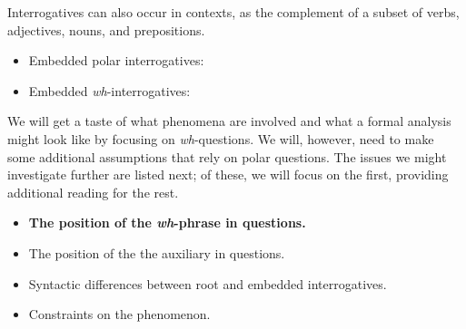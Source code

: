 \documentclass{article}
\begin{document}
Interrogatives can also occur in  contexts, as the complement of a subset of verbs, adjectives, nouns, and prepositions.
\begin{itemize}
\item Embedded polar interrogatives:
\begin{exe}
\end{exe}
\item Embedded \emph{wh}-interrogatives:
\begin{exe}
\end{exe}
\end{itemize}

We will get a taste of what phenomena are involved and what a formal analysis might look like by focusing on \emph{wh}-questions. We will, however, need to make some additional assumptions that rely on polar questions. The issues we might investigate further are listed next; of these, we will focus on the first, providing additional reading for the rest.

\begin{itemize}
\item \textbf{The position of the \emph{wh}-phrase in questions.}
\item The position of the the auxiliary in questions.
\item Syntactic differences between root and embedded interrogatives.
\item Constraints on the phenomenon.
\end{itemize}
\end{document}
